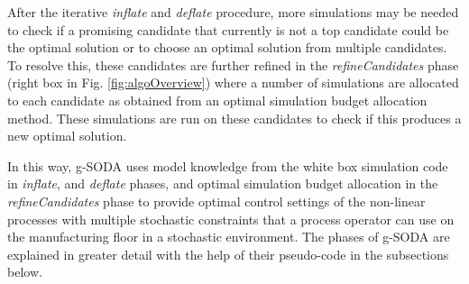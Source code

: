 \documentclass[a4paper, 12pt]{article} %
\begin{document}
After the iterative \textit{inflate} and \textit{deflate} procedure, more simulations may be needed to check if a promising candidate that currently is not a top candidate could be the optimal solution or to choose an optimal solution from multiple candidates. 
To resolve this, these candidates are further refined in the \textit{refineCandidates} phase (right box in Fig. \ref{fig:algoOverview}) where a number of simulations are allocated to each candidate as obtained from an optimal simulation budget allocation method. These simulations are run on these candidates to check if this produces a new optimal solution.

In this way, g-SODA uses model knowledge from the white box simulation code in \textit{inflate}, and \textit{deflate} phases, and optimal simulation budget allocation in the \textit{refineCandidates} phase to provide optimal control settings of the non-linear processes with multiple stochastic constraints that a process operator can use on the manufacturing floor in a stochastic environment. The phases of g-SODA are explained in greater detail with the help of their pseudo-code in the subsections below.
\end{document}
